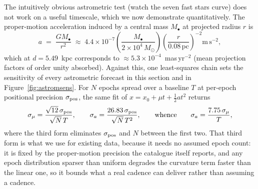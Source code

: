 \documentclass[11pt]{article}
\newcommand{\msun}{\ensuremath{M_\odot}}
\begin{document}
The intuitively obvious astrometric test (watch the seven fast stars curve) does not work on a useful timescale, which we now demonstrate quantitatively. The proper-motion acceleration induced by a central mass $M_{\bullet}$ at projected radius $r$ is
\begin{equation}
a \;=\; \frac{GM_{\bullet}}{r^{2}} \;\approx\; 4.4\times10^{-7}
\left(\frac{M_{\bullet}}{2\times10^{4}\,\msun}\right)
\left(\frac{r}{0.08\,\mathrm{pc}}\right)^{-2} \mathrm{m\,s^{-2}},
\label{eq:accel}
\end{equation}
which at $d = 5.49$~kpc corresponds to $\approx 5.3\times10^{-4}$~mas\,yr$^{-2}$ (mean projection factors of order unity absorbed). Against this, one least-squares chain sets the sensitivity of every astrometric forecast in this section and in Figure~\ref{fig:astromsens}. For $N$ epochs spread over a baseline $T$ at per-epoch positional precision $\sigma_{\rm pos}$, the same fit of $x = x_{0} + \mu t + \tfrac{1}{2}a t^{2}$ returns
\begin{equation}
\sigma_{\mu} = \frac{\sqrt{12}\,\sigma_{\rm pos}}{\sqrt{N}\,T},
\qquad
\sigma_{a} = \frac{26.83\,\sigma_{\rm pos}}{\sqrt{N}\,T^{2}},
\qquad\text{whence}\qquad
\sigma_{a} = \frac{7.75\,\sigma_{\mu}}{T},
\label{eq:astromchain}
\end{equation}
where the third form eliminates $\sigma_{\rm pos}$ and $N$ between the first two. That third form is what we use for existing data, because it needs no assumed epoch count: it is fixed by the proper-motion precision the catalogue itself reports, and any epoch distribution sparser than uniform degrades the curvature term faster than the linear one, so it bounds what a real cadence can deliver rather than assuming a cadence.
\end{document}
